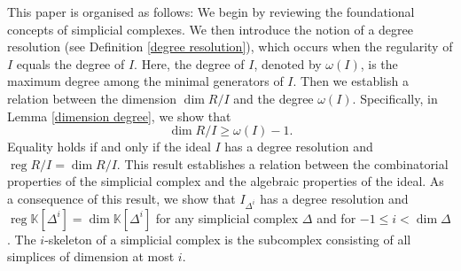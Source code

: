 \documentclass[a4paper,12pt]{amsart}
\numberwithin{equation}{section}
\theoremstyle{definition}
\newcommand{\K}[0]{\mathbb{K}}
\DeclareMathOperator{\reg}{reg}
\begin{document}




This paper is organised as follows: We begin by reviewing the foundational concepts of simplicial complexes. We then introduce the notion of a degree resolution (see Definition \ref{degree resolution}), which occurs when the regularity of $I$ equals the degree of $I$. Here, the degree of $I$, denoted by $\omega(I)$, is the maximum degree among the minimal generators of $I$. Then we establish a relation between the dimension $\dim R/I$ and the degree $\omega(I)$. Specifically, in Lemma \ref{dimension degree}, we show that 
$$\dim R/I\ge\omega(I)-1.$$
Equality holds if and only if the ideal $I$ has a degree resolution and $\reg R/I=\dim R/I$. This result establishes a relation between the combinatorial properties of the simplicial complex and the algebraic properties of the ideal. As a consequence of this result, we show that $I_{\Delta^i}$ has a degree resolution and $\reg\K[\Delta^i]=\dim\K[\Delta^i]$ for any simplicial complex $\Delta$ and for $-1\leq i<\dim\Delta$. The $i$-skeleton of a simplicial complex is the subcomplex consisting of all simplices of dimension at most $i$.
\end{document}
